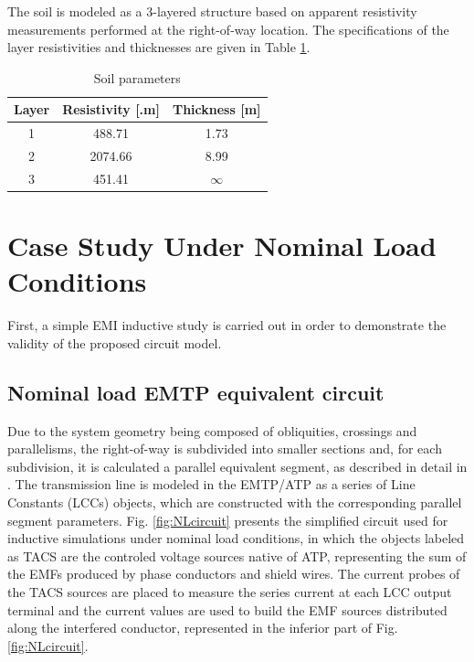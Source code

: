 \documentclass{IEEEtran4PSCC}
\begin{document}
The soil is modeled as a 3-layered structure based on apparent resistivity measurements performed at the right-of-way location. The specifications of the layer resistivities and thicknesses are given in Table \ref{tab:SoilParameters}.

 
\begin{table}[h]
	\renewcommand{\arraystretch}{1.3}
	\centering
	\caption{Soil parameters}
	\footnotesize
	\begin{tabular}{ccc}
		\hline
		\textbf{Layer}         & \textbf{Resistivity [\boldmath{$\Omega$}.m]} & \textbf{Thickness [m]}  \\ \hline
		1     & 488.71                        & 1.73                       \\ 
		2     & 2074.66                         & 8.99                               \\
		3     & 451.41                           & $\infty$                         \\ \hline
	\end{tabular}
	\label{tab:SoilParameters}
\end{table}

\section{Case Study Under Nominal Load Conditions}

First, a simple EMI inductive study is carried out in order to demonstrate the validity of the proposed circuit model.

\subsection{Nominal load EMTP equivalent circuit}

Due to the system geometry being composed of obliquities, crossings and parallelisms, the right-of-way is subdivided into smaller sections and, for each subdivision, it is calculated a parallel equivalent segment, as described in detail in \cite{Moraes2020}. The transmission line is modeled in the EMTP/ATP as a series of Line Constants (LCCs) objects,  which are constructed with the corresponding parallel segment parameters. Fig. \ref{fig:NLcircuit} presents the simplified circuit used for inductive simulations under nominal load conditions, in which the objects labeled as TACS are the controled voltage sources native of ATP, representing the sum of the EMFs produced by phase conductors and shield wires. The current probes of the TACS sources are placed to measure the series current at each LCC output terminal and the current values are used to build the EMF sources distributed along the interfered conductor, represented in the inferior part of Fig. \ref{fig:NLcircuit}.
\end{document}
